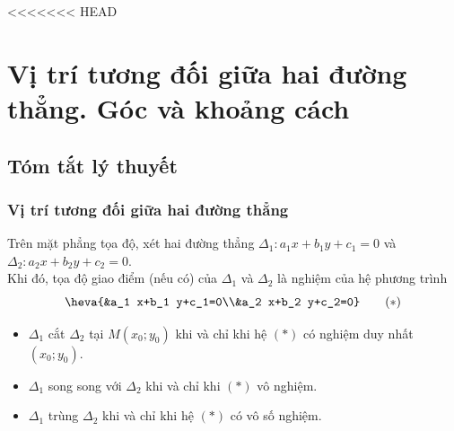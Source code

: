 <<<<<<< HEAD
\newpage\setcounter{dang}{0}
\section{Vị trí tương đối giữa hai đường thẳng. Góc và khoảng cách}
\subsection{Tóm tắt lý thuyết}
\subsubsection{Vị trí tương đối giữa hai đường thẳng}
	Trên mặt phẳng tọa độ, xét hai đường thẳng $\Delta_1 \colon a_1 x+b_1 y+c_1=0$ và $\Delta_2 \colon a_2 x+b_2 y+c_2=0$.\\
	Khi đó, tọa độ giao điểm (nếu có) của $\Delta_1$ và $\Delta_2$ là nghiệm của hệ phương trình
	$$\heva{&a_1 x+b_1 y+c_1=0\\&a_2 x+b_2 y+c_2=0}\qquad(*)$$
	\begin{itemize}
		\item $\Delta_1$ cắt $\Delta_2$ tại $M(x_0;y_0)$ khi và chỉ khi hệ $(*)$ có nghiệm duy nhất $(x_0;y_0)$.
		\item $\Delta_1$ song song với $\Delta_2$ khi và chỉ khi $(*)$ vô nghiệm.
		\item $\Delta_1$ trùng $\Delta_2$ khi và chỉ khi hệ $(*)$ có vô số nghiệm.
	\end{itemize}
